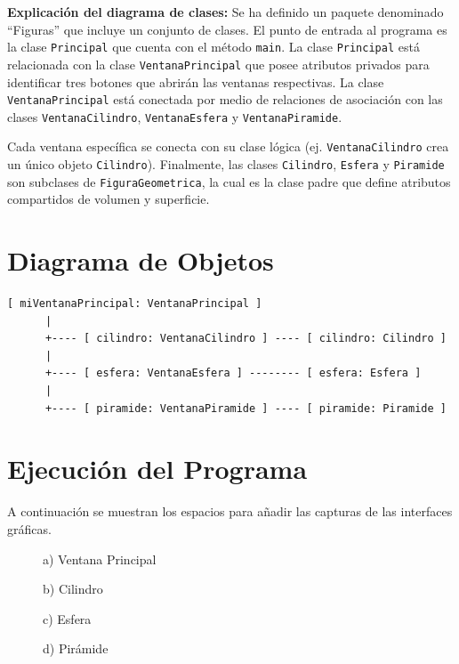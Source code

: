 \documentclass[12pt,a4paper]{article}
\begin{document}
\textbf{Explicación del diagrama de clases:}
Se ha definido un paquete denominado ``Figuras'' que incluye un conjunto de clases. El punto de entrada al programa es la clase \texttt{Principal} que cuenta con el método \texttt{main}. La clase \texttt{Principal} está relacionada con la clase \texttt{VentanaPrincipal} que posee atributos privados para identificar tres botones que abrirán las ventanas respectivas. La clase \texttt{VentanaPrincipal} está conectada por medio de relaciones de asociación con las clases \texttt{VentanaCilindro}, \texttt{VentanaEsfera} y \texttt{VentanaPiramide}. 

Cada ventana específica se conecta con su clase lógica (ej. \texttt{VentanaCilindro} crea un único objeto \texttt{Cilindro}). Finalmente, las clases \texttt{Cilindro}, \texttt{Esfera} y \texttt{Piramide} son subclases de \texttt{FiguraGeometrica}, la cual es la clase padre que define atributos compartidos de volumen y superficie.

\section{Diagrama de Objetos}
\begin{verbatim}
[ miVentanaPrincipal: VentanaPrincipal ]
      |
      +---- [ cilindro: VentanaCilindro ] ---- [ cilindro: Cilindro ]
      |
      +---- [ esfera: VentanaEsfera ] -------- [ esfera: Esfera ]
      |
      +---- [ piramide: VentanaPiramide ] ---- [ piramide: Piramide ]
\end{verbatim}

\section{Ejecución del Programa}
A continuación se muestran los espacios para añadir las capturas de las interfaces gráficas.

\begin{figure}[h]
    \centering
    \vspace{2cm} 
    \caption{a) Ventana Principal}
\end{figure}
\begin{figure}[h]
    \centering
    \vspace{2cm} 
    \caption{b) Cilindro}
\end{figure}
\begin{figure}[h]
    \centering
    \vspace{2cm} 
    \caption{c) Esfera}
\end{figure}
\begin{figure}[h]
    \centering
    \vspace{2cm} 
    \caption{d) Pirámide}
\end{figure}
\end{document}

